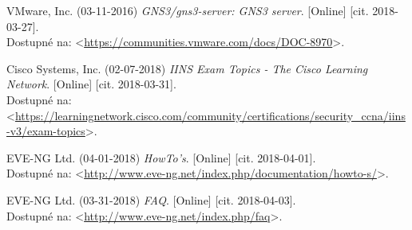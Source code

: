 \begin{thebibliography}{99}
VMware, Inc. (03-11-2016) {\it GNS3/gns3-server: GNS3 server}. [Online] [cit. 2018-03-27]. \\
Dostupné na: <\url{https://communities.vmware.com/docs/DOC-8970}>.

Cisco Systems, Inc. (02-07-2018) {\it IINS Exam Topics - The Cisco Learning Network}. [Online] [cit. 2018-03-31]. \\
Dostupné na: \\
<\url{https://learningnetwork.cisco.com/community/certifications/security_ccna/iins-v3/exam-topics}>.

EVE-NG Ltd. (04-01-2018) {\it HowTo's}. [Online] [cit. 2018-04-01]. \\
Dostupné na: <\url{http://www.eve-ng.net/index.php/documentation/howto-s/}>.

EVE-NG Ltd. (03-31-2018) {\it FAQ}. [Online] [cit. 2018-04-03]. \\
Dostupné na: <\url{http://www.eve-ng.net/index.php/faq}>.

\end{thebibliography}


